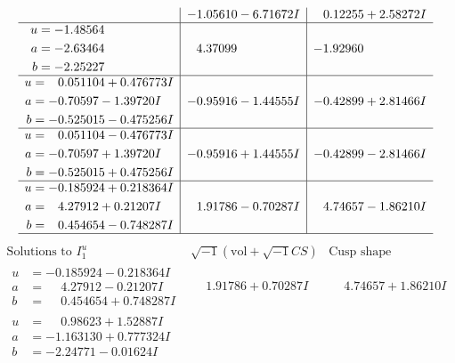 \documentclass[1p]{elsarticle_modified}
\theoremstyle{definition}
\newcommand{\I}{\sqrt{-1}}
\begin{document}
$$\begin{array}{c|c|c}
 & -1.05610 - 6.71672 I & \phantom{-}0.12255 + 2.58272 I \\ \hline\begin{aligned}
u &= -1.48564\phantom{ +0.000000I} \\
a &= -2.63464\phantom{ +0.000000I} \\
b &= -2.25227\phantom{ +0.000000I}\end{aligned}
 & \phantom{-}4.37099\phantom{ +0.000000I} & -1.92960\phantom{ +0.000000I} \\ \hline\begin{aligned}
u &= \phantom{-}0.051104 + 0.476773 I \\
a &= -0.70597 - 1.39720 I \\
b &= -0.525015 - 0.475256 I\end{aligned}
 & -0.95916 - 1.44555 I & -0.42899 + 2.81466 I \\ \hline\begin{aligned}
u &= \phantom{-}0.051104 - 0.476773 I \\
a &= -0.70597 + 1.39720 I \\
b &= -0.525015 + 0.475256 I\end{aligned}
 & -0.95916 + 1.44555 I & -0.42899 - 2.81466 I \\ \hline\begin{aligned}
u &= -0.185924 + 0.218364 I \\
a &= \phantom{-}4.27912 + 0.21207 I \\
b &= \phantom{-}0.454654 - 0.748287 I\end{aligned}
 & \phantom{-}1.91786 - 0.70287 I & \phantom{-}4.74657 - 1.86210 I\\
 \hline 
 \end{array}$$\newpage$$\begin{array}{c|c|c}  
\text{Solutions to }I^u_{1}& \I (\text{vol} + \sqrt{-1}CS) & \text{Cusp shape}\\
 \hline 
\begin{aligned}
u &= -0.185924 - 0.218364 I \\
a &= \phantom{-}4.27912 - 0.21207 I \\
b &= \phantom{-}0.454654 + 0.748287 I\end{aligned}
 & \phantom{-}1.91786 + 0.70287 I & \phantom{-}4.74657 + 1.86210 I \\ \hline\begin{aligned}
u &= \phantom{-}0.98623 + 1.52887 I \\
a &= -1.163130 + 0.777324 I \\
b &= -2.24771 - 0.01624 I\end{aligned}

\end{array}$$
\end{document}
